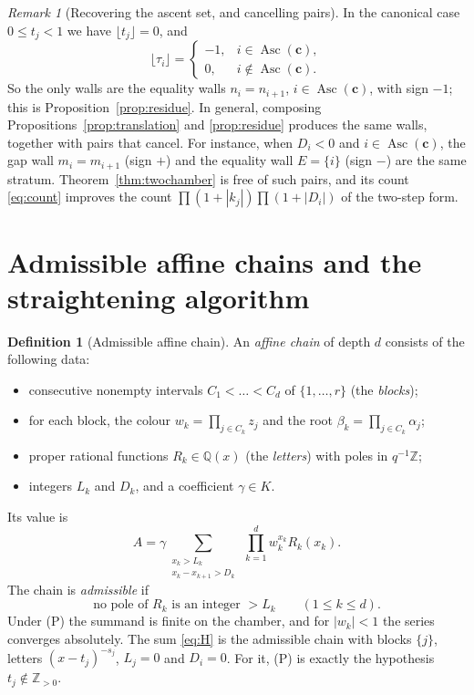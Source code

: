 \documentclass[11pt]{amsart}
\theoremstyle{definition}
\newtheorem{definition}[theorem]{Definition}
\theoremstyle{remark}
\newtheorem{remark}[theorem]{Remark}
\numberwithin{equation}{section}
\newcommand{\Z}{\mathbb{Z}}
\newcommand{\Q}{\mathbb{Q}}
\newcommand{\Asc}{\operatorname{Asc}}
\newcommand{\cb}{\mathbf{c}}
\newcommand{\lfl}{\lfloor}
\newcommand{\rfl}{\rfloor}
\begin{document}
\begin{remark}[Recovering the ascent set, and cancelling pairs]\label{rem:pairs}
In the canonical case $0\le t_j<1$ we have $\lfl t_j\rfl=0$, and
\[
\lfl\tau_i\rfl=\begin{cases}-1,& i\in\Asc(\cb),\\ 0,& i\notin\Asc(\cb).\end{cases}
\]
So the only walls are the equality walls $n_i=n_{i+1}$, $i\in\Asc(\cb)$, with sign $-1$; this is Proposition~\ref{prop:residue}. In general, composing Propositions~\ref{prop:translation} and \ref{prop:residue} produces the same walls, together with pairs that cancel. For instance, when $D_i<0$ and $i\in\Asc(\cb)$, the gap wall $m_i=m_{i+1}$ (sign $+$) and the equality wall $E=\{i\}$ (sign $-$) are the same stratum. Theorem~\ref{thm:twochamber} is free of such pairs, and its count \eqref{eq:count} improves the count $\prod(1+|k_j|)\prod(1+|D_i|)$ of the two-step form.
\end{remark}

\section{Admissible affine chains and the straightening algorithm}\label{sec:algorithm}

\begin{definition}[Admissible affine chain]\label{def:chain}
An \emph{affine chain} of depth $d$ consists of the following data:
\begin{itemize}[leftmargin=1.5em]
\item consecutive nonempty intervals $C_1<\dots<C_d$ of $\{1,\dots,r\}$ (the \emph{blocks});
\item for each block, the colour $w_k=\prod_{j\in C_k}z_j$ and the root $\beta_k=\prod_{j\in C_k}\alpha_j$;
\item proper rational functions $R_k\in\Q(x)$ (the \emph{letters}) with poles in $q^{-1}\Z$;
\item integers $L_k$ and $D_k$, and a coefficient $\gamma\in K$.
\end{itemize}
Its value is
\[
A=\gamma\sum_{\substack{x_k>L_k\\ x_k-x_{k+1}>D_k}}\ \prod_{k=1}^dw_k^{x_k}R_k(x_k).
\]
The chain is \emph{admissible} if
\begin{equation}\tag{P}
\text{no pole of $R_k$ is an integer $>L_k$}\qquad(1\le k\le d).
\end{equation}
Under (P) the summand is finite on the chamber, and for $|w_k|<1$ the series converges absolutely. The sum \eqref{eq:H} is the admissible chain with blocks $\{j\}$, letters $(x-t_j)^{-s_j}$, $L_j=0$ and $D_i=0$. For it, (P) is exactly the hypothesis $t_j\notin\Z_{>0}$.
\end{definition}
\end{document}
